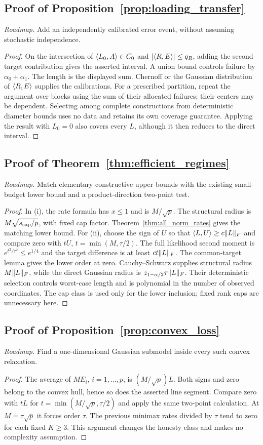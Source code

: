 \subsection{Proof of Proposition~\ref{prop:loading_transfer}}
\noindent\emph{Roadmap.} Add an independently calibrated error event, without assuming stochastic independence.
\begin{proof}
On the intersection of $\langle L_0,A\rangle\in C_0$ and $|\langle R,E\rangle|\le q_R$, adding the second target contribution gives the asserted interval. A union bound controls failure by $\alpha_0+\alpha_1$. The length is the displayed sum. Chernoff or the Gaussian distribution of $\langle R,E\rangle$ supplies the calibrations. For a prescribed partition, repeat the argument over blocks using the sum of their allocated failures; their centers may be dependent. Selecting among complete constructions from deterministic diameter bounds uses no data and retains its own coverage guarantee. Applying the result with $L_0=0$ also covers every $L$, although it then reduces to the direct interval.
\end{proof}

\subsection{Proof of Theorem~\ref{thm:efficient_regimes}}
\noindent\emph{Roadmap.} Match elementary constructive upper bounds with the existing small-budget lower bound and a product-direction two-point test.
\begin{proof}
In (i), the rate formula has $x\le1$ and is $M/\sqrt p$. The structural radius is $M\sqrt{s_{\rm cap}/p}$, with fixed cap factor. Theorem~\ref{thm:all_norm_rates} gives the matching lower bound.
For (ii), choose the sign of $U$ so that $\langle L,U\rangle\ge c\lVert L\rVert_F$ and compare zero with $tU$, $t=\min(M,\tau/2)$. The full likelihood second moment is $e^{t^2/\tau^2}\le e^{1/4}$ and the target difference is at least $ct\lVert L\rVert_F$. The common-target lemma gives the lower order at zero. Cauchy--Schwarz supplies structural radius $M\lVert L\rVert_F$, while the direct Gaussian radius is $z_{1-\alpha/2}\tau\lVert L\rVert_F$. Their deterministic selection controls worst-case length and is polynomial in the number of observed coordinates. The cap class is used only for the lower inclusion; fixed rank caps are unnecessary here.
\end{proof}

\subsection{Proof of Proposition~\ref{prop:convex_loss}}
\noindent\emph{Roadmap.} Find a one-dimensional Gaussian submodel inside every such convex relaxation.
\begin{proof}
The average of $ME_i$, $i=1,\ldots,p$, is $(M/\sqrt p)L$. Both signs and zero belong to the convex hull, hence so does the asserted line segment. Compare zero with $tL$ for $t=\min(M/\sqrt p,\tau/2)$ and apply the same two-point calculation. At $M=\tau\sqrt p$ it forces order $\tau$. The previous minimax rates divided by $\tau$ tend to zero for each fixed $K\ge3$. This argument changes the honesty class and makes no complexity assumption.
\end{proof}

